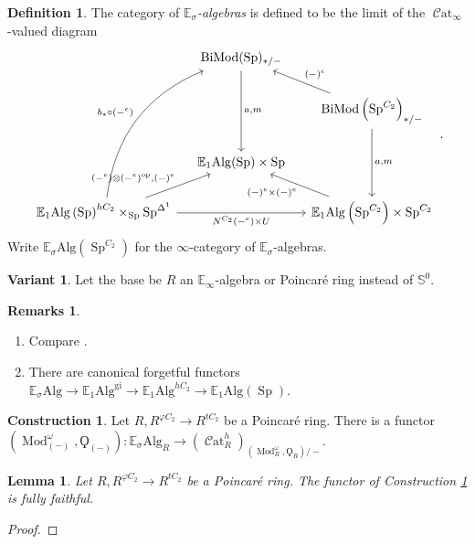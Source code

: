 \documentclass{article}
\DeclareMathOperator{\Cat}{\mathcal{C}at} %
\DeclareMathOperator{\Mod}{Mod} %
\DeclareMathOperator{\BiMod}{BiMod} %
\DeclareMathOperator{\Spectra}{Sp} %
\newtheorem{lemma}[equation]{Lemma}
\theoremstyle{definition}
\newtheorem{definition}[equation]{Definition}
\newtheorem{construction}[equation]{Construction}
\newtheorem{remarks}[equation]{Remarks}
\newtheorem{variant}[equation]{Variant}
\begin{document}
\begin{definition}
    The category of \emph{$\mathbb{E}_\sigma$-algebras} is defined to be the limit of the $\Cat_\infty$-valued diagram 
    \begin{equation}\label{diagram:E_sigma_alg}
    \begin{tikzcd}[column sep=small]
        & \BiMod(\Spectra)_{*/-} \ar[dd,"{a,m}"]  & \\
        & & \BiMod\left(\Spectra^{C_2}\right)_{*/-} \ar[dd,"{a, m}"] \ar[lu,"{(-)^e}"'] \\
        &\mathbb{E}_1\mathrm{Alg}(\Spectra) \times \Spectra & \\
        \mathbb{E}_1\mathrm{Alg}\left(\Spectra\right)^{hC_2} \times_{\Spectra} \Spectra^{\Delta^1}  \ar[rr,"{N^{C_2}(-^e) \times U}"'] \ar[ru,"{(-^e) \otimes(-^ e)^\mathrm{op}, (-)^e}"] \ar[ruuu,"{b_* \circ (-^e)}", bend left=30] & &\mathbb{E}_1\mathrm{Alg}\left(\Spectra^{C_2}\right) \times \Spectra^{C_2} \ar[lu,"{(-)^e \times (-)^e}"]
    \end{tikzcd}\,.
    \end{equation}   
    Write $ \mathbb{E}_\sigma\mathrm{Alg}\left(\Spectra^{C_2}\right) $ for the $\infty $-category of $\mathbb{E}_\sigma$-algebras. 
\end{definition}
\begin{variant}
    Let the base be $ R $ an $ \mathbb{E}_\infty $-algebra or Poincaré ring instead of $ \mathbb{S}^0 $. 
\end{variant}
\begin{remarks}
\begin{enumerate}
    \item Compare \cite[Corollary 3.10]{AKGH_real_THH}. 
    \item There are canonical forgetful functors $  \mathbb{E}_\sigma\mathrm{Alg} \to \mathbb{E}_1\mathrm{Alg}^{\mathrm{gi}} \to \mathbb{E}_1\mathrm{Alg}^{hC_2} \to \mathbb{E}_1\mathrm{Alg}(\Spectra) $. 
\end{enumerate}
\end{remarks}
\begin{construction}\label{cons:Esigma_alg_to_R_lin_hermitian_cat}
    Let $ R, R^{\varphi C_2} \to R^{tC_2} $ be a Poincaré ring. 
    There is a functor $ \left(\Mod_{(-)}^\omega, \Qoppa_{(-)}\right) \colon \mathbb{E}_\sigma\mathrm{Alg}_R \to \left(\Cat^h_R\right)_{\left(\Mod_R^\omega,\Qoppa_R\right)/-} $. 
\end{construction}
\begin{lemma}
    Let $ R, R^{\varphi C_2} \to R^{tC_2} $ be a Poincaré ring. 
    The functor of Construction \ref{cons:Esigma_alg_to_R_lin_hermitian_cat} is fully faithful. 
\end{lemma} 
\begin{proof}
    
\end{proof}
\end{document}
